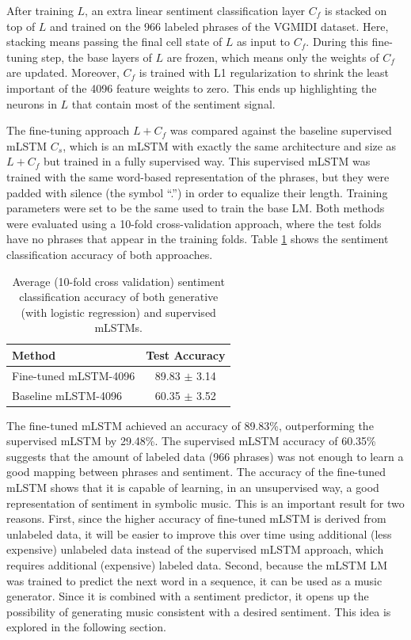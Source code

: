 After training $L$, an extra linear sentiment classification layer $C_f$ is stacked on top of $L$ and trained on the 966 labeled phrases of the VGMIDI dataset. Here, stacking means passing the final cell state of $L$ as input to $C_f$. During this fine-tuning step, the base layers of $L$ are frozen, which means only the weights of $C_f$ are updated. Moreover, $C_f$ is trained with L1 regularization to shrink the least important of the 4096 feature weights to zero. This ends up highlighting the neurons in $L$ that contain most of the sentiment signal.

The fine-tuning approach $L + C_f$ was compared against the baseline supervised mLSTM $C_s$, which is an mLSTM with exactly the same architecture and size as $L + C_f$ but trained in a fully supervised way. This supervised mLSTM was trained with the same word-based representation of the phrases, but they were padded with silence (the symbol ``.'') in order to equalize their length. Training parameters were set to be the same used to train the base LM. Both methods were evaluated using a 10-fold cross-validation approach, where the test folds have no phrases that appear in the training folds. Table \ref{tab:sent_anal} shows the sentiment classification accuracy of both approaches.

\begin{table}[!h]
 \begin{center}
 \begin{tabular}{lc}
  \hline
  \textbf{Method} & \textbf{Test Accuracy} \\ \hline
  Fine-tuned mLSTM-4096 & 89.83 $\pm$ 3.14\\
  Baseline  mLSTM-4096 & 60.35 $\pm$ 3.52 \\
  \hline
 \end{tabular}
\end{center}
\caption{Average (10-fold cross validation) sentiment classification accuracy of both generative (with logistic regression) and supervised mLSTMs.}
 \label{tab:sent_anal}
\end{table}

The fine-tuned mLSTM achieved an accuracy of 89.83\%, outperforming the supervised mLSTM by 29.48\%. The supervised mLSTM accuracy of 60.35\% suggests that the amount of labeled data (966 phrases) was not enough to learn a good mapping between phrases and sentiment. The accuracy of the fine-tuned mLSTM shows that it is capable of learning, in an unsupervised way, a good representation of sentiment in symbolic music. This is an important result for two reasons. First, since the higher accuracy of fine-tuned mLSTM is derived from unlabeled data, it will be easier to improve this over time using additional (less expensive) unlabeled data instead of the supervised mLSTM approach, which requires additional (expensive) labeled data. Second, because the mLSTM LM was trained to predict the next word in a sequence, it can be used as a music generator. Since it is combined with a sentiment predictor, it opens up the possibility of generating music consistent with a desired sentiment. This idea is explored in the following section.


